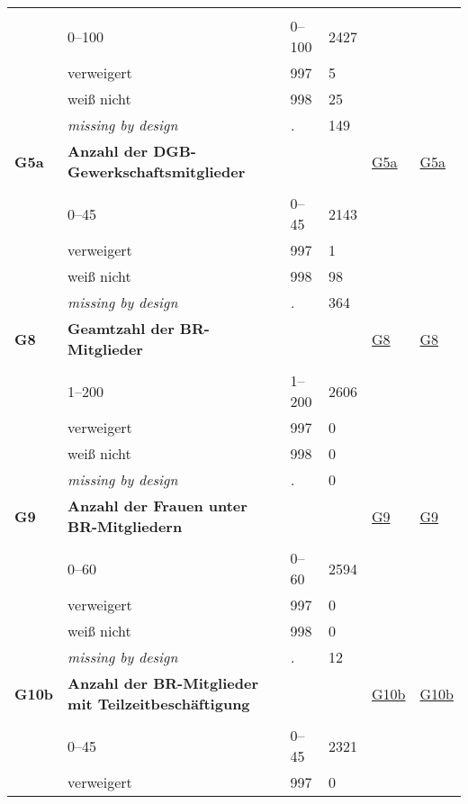 \begin{longtable}{| L{2.45cm} | L{6cm} | C{1.5cm} | R{1cm} | C{2.25cm} | C{2.25cm} |}
   &  &  &  &  &  \\ 
   & 0--100 & 0--100 & 2427 &  &  \\ 
   & verweigert & 997 & 5 &  &  \\ 
   & weiß nicht & 998 & 25 &  &  \\ 
   & \textit{missing by design} & \textit{.} & 149 &  &  \\ 
   \midrule
\textbf{G5a}\label{var:G5a} & \textbf{Anzahl der DGB-Gewerkschaftsmitglieder} &  &  & \hyperref[G5a]{G5a} & \hyperref[var:suf:G5a]{G5a} \\ 
   &  &  &  &  &  \\ 
   & 0--45 & 0--45 & 2143 &  &  \\ 
   & verweigert & 997 & 1 &  &  \\ 
   & weiß nicht & 998 & 98 &  &  \\ 
   & \textit{missing by design} & \textit{.} & 364 &  &  \\ 
   \midrule
\textbf{G8}\label{var:G8} & \textbf{Geamtzahl der BR-Mitglieder} &  &  & \hyperref[G8]{G8} & \hyperref[var:suf:G8]{G8} \\ 
   &  &  &  &  &  \\ 
   & 1--200 & 1--200 & 2606 &  &  \\ 
   & verweigert & 997 & 0 &  &  \\ 
   & weiß nicht & 998 & 0 &  &  \\ 
   & \textit{missing by design} & \textit{.} & 0 &  &  \\ 
   \midrule
\textbf{G9}\label{var:G9} & \textbf{Anzahl der Frauen unter BR-Mitgliedern} &  &  & \hyperref[G9]{G9} & \hyperref[var:suf:G9]{G9} \\ 
   &  &  &  &  &  \\ 
   & 0--60 & 0--60 & 2594 &  &  \\ 
   & verweigert & 997 & 0 &  &  \\ 
   & weiß nicht & 998 & 0 &  &  \\ 
   & \textit{missing by design} & \textit{.} & 12 &  &  \\ 
   \midrule
\textbf{G10b}\label{var:G10b} & \textbf{Anzahl der BR-Mitglieder mit Teilzeitbeschäftigung} &  &  & \hyperref[G10b]{G10b} & \hyperref[var:suf:G10b]{G10b} \\ 
   &  &  &  &  &  \\ 
   & 0--45 & 0--45 & 2321 &  &  \\ 
   & verweigert & 997 & 0 &  &  \\ 

\end{longtable}
